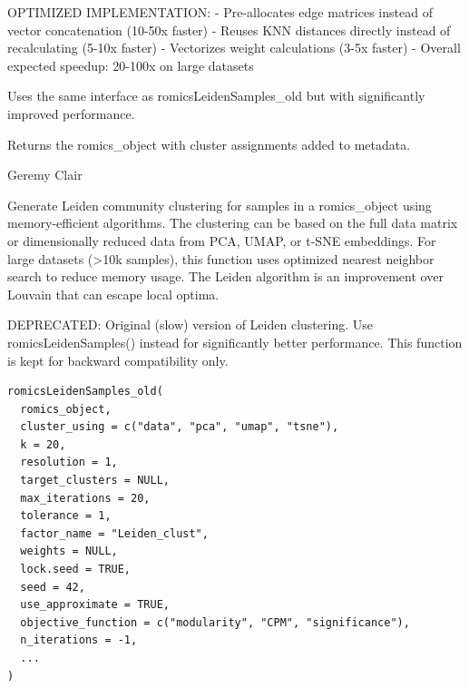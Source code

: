 \documentclass[a4paper]{book}
\begin{document}
%
\begin{Details}
OPTIMIZED IMPLEMENTATION:
- Pre-allocates edge matrices instead of vector concatenation (10-50x faster)
- Reuses KNN distances directly instead of recalculating (5-10x faster)
- Vectorizes weight calculations (3-5x faster)
- Overall expected speedup: 20-100x on large datasets

Uses the same interface as romicsLeidenSamples\_old but with significantly improved performance.
\end{Details}
%
\begin{Value}
Returns the romics\_object with cluster assignments added to metadata.
\end{Value}
%
\begin{Author}
Geremy Clair
\end{Author}
%
\begin{Description}
Generate Leiden community clustering for samples in a romics\_object using memory-efficient algorithms.
The clustering can be based on the full data matrix or dimensionally reduced data from PCA, UMAP, or t-SNE embeddings.
For large datasets (>10k samples), this function uses optimized nearest neighbor search to reduce memory usage.
The Leiden algorithm is an improvement over Louvain that can escape local optima.

DEPRECATED: Original (slow) version of Leiden clustering. Use romicsLeidenSamples() instead for significantly better performance.
This function is kept for backward compatibility only.
\end{Description}
%
\begin{Usage}
\begin{verbatim}
romicsLeidenSamples_old(
  romics_object,
  cluster_using = c("data", "pca", "umap", "tsne"),
  k = 20,
  resolution = 1,
  target_clusters = NULL,
  max_iterations = 20,
  tolerance = 1,
  factor_name = "Leiden_clust",
  weights = NULL,
  lock.seed = TRUE,
  seed = 42,
  use_approximate = TRUE,
  objective_function = c("modularity", "CPM", "significance"),
  n_iterations = -1,
  ...
)
\end{verbatim}
\end{Usage}
%
\end{document}
